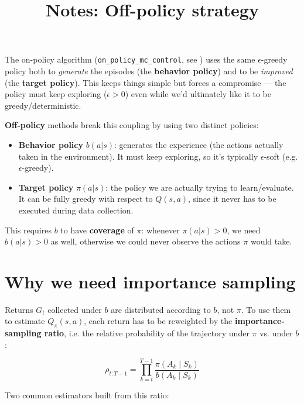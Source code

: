 \documentclass[11pt]{article}
\title{Notes: Off-policy strategy}
\date{}
\begin{document}
\maketitle

The on-policy algorithm (\texttt{on\_policy\_mc\_control}, see
\href{../../on_policy_monte_carlo/opmc_c/Section_4_on_policy_constant_alpha_mc.ipynb}{})
uses the same $\epsilon$-greedy policy both to \emph{generate} the episodes (the \textbf{behavior policy}) and to be \emph{improved} (the \textbf{target policy}). This keeps things simple but forces a compromise --- the policy must keep exploring ($\epsilon > 0$) even while we'd ultimately like it to be greedy/deterministic.

\textbf{Off-policy} methods break this coupling by using two distinct policies:

\begin{itemize}
    \item \textbf{Behavior policy} $b(a|s)$: generates the experience (the actions actually taken in the environment). It must keep exploring, so it's typically $\epsilon$-soft (e.g. $\epsilon$-greedy).
    \item \textbf{Target policy} $\pi(a|s)$: the policy we are actually trying to learn/evaluate. It can be fully greedy with respect to $Q(s,a)$, since it never has to be executed during data collection.
\end{itemize}

This requires $b$ to have \textbf{coverage} of $\pi$: whenever $\pi(a|s) > 0$, we need $b(a|s) > 0$ as well, otherwise we could never observe the actions $\pi$ would take.

\section*{Why we need importance sampling}

Returns $G_t$ collected under $b$ are distributed according to $b$, not $\pi$. To use them to estimate $Q_\pi(s,a)$, each return has to be reweighted by the \textbf{importance-sampling ratio}, i.e. the relative probability of the trajectory under $\pi$ vs. under $b$:

\begin{equation}
\rho_{t:T-1} = \prod_{k=t}^{T-1} \frac{\pi(A_k \mid S_k)}{b(A_k \mid S_k)}
\end{equation}

Two common estimators built from this ratio:
\end{document}
